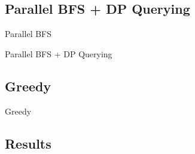\documentclass[t,10pt,
mathserif,xcolor=dvipsnames]{beamer}
\begin{document}
\subsection{Parallel BFS + DP Querying}

\begin{myframe}{Parallel BFS}

\end{myframe}

\begin{myframe}{Parallel BFS + DP Querying}

\end{myframe}

\subsection{Greedy}

\begin{myframe}{Greedy}

\end{myframe}

\def\tikzoverlay{%
   \tikz[baseline,overlay]\node[every overlay node]
}%

\subsection{Results}
\end{document}
